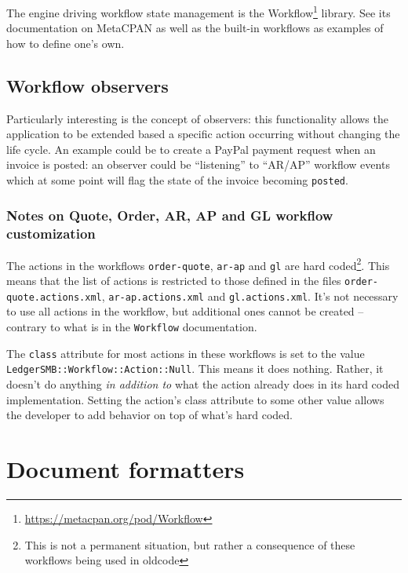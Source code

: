 The engine driving workflow state management is the
Workflow\footnote{\url{https://metacpan.org/pod/Workflow}} library.  See its
documentation on MetaCPAN as well as the built-in workflows as examples of how
to define one's own.

\subsection{Workflow observers}
\label{subsec-customization-workflow-observers}

Particularly interesting is the concept of observers:
this functionality allows the application to be extended based a specific action
occurring without changing the life cycle.  An example could be to create a PayPal
payment request when an invoice is posted: an observer could be ``listening'' to
``AR/AP'' workflow events which at some point will flag the state of the invoice
becoming \texttt{posted}.

\subsubsection{Notes on Quote, Order, AR, AP and GL workflow customization}
\label{subsubsec-customization-workflow-observers-notes}

The actions in the workflows \texttt{order-quote}, \texttt{ar-ap} and \texttt{gl} are
hard coded\footnote{This is not a permanent situation, but rather a consequence of
these workflows being used in \gls{oldcode}}.  This means that the list of actions is restricted to those defined in the
files \texttt{order-quote.actions.xml}, \texttt{ar-ap.actions.xml} and
\texttt{gl.actions.xml}.  It's not necessary to use all actions in the workflow, but
additional ones cannot be created -- contrary to what is in the \texttt{Workflow}
documentation.

The \texttt{class} attribute for most actions in these workflows is set to the value
\texttt{LedgerSMB::Workflow::Action::Null}.  This means it does nothing.  Rather, it
doesn't do anything \textit{in addition to} what the action already does in its hard
coded implementation.  Setting the action's class attribute to some other value allows
the developer to add behavior on top of what's hard coded.

\section{Document formatters}
\label{sec-customization-document-formatters}

